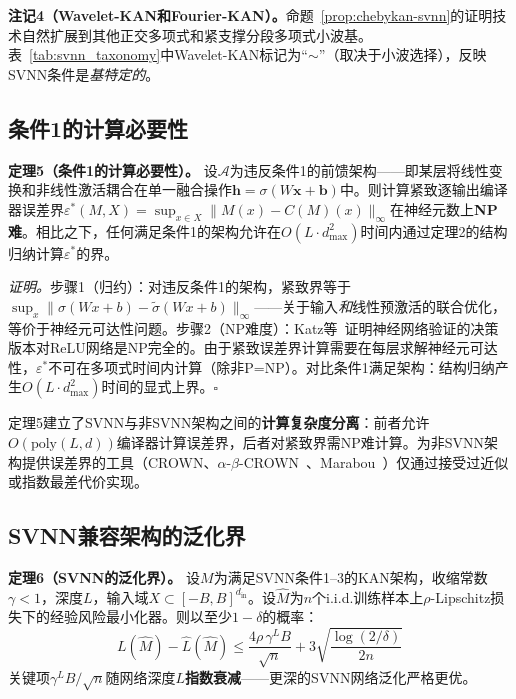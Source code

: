 \vspace{4pt}
\noindent\textbf{注记4（Wavelet-KAN和Fourier-KAN）。}命题~\ref{prop:chebykan-svnn}的证明技术自然扩展到其他正交多项式和紧支撑分段多项式小波基。表~\ref{tab:svnn_taxonomy}中Wavelet-KAN标记为``$\sim$''（取决于小波选择），反映SVNN条件是\textit{基特定的}。

\subsection{条件1的计算必要性}
\label{sec:svnn-necessity}

\vspace{4pt}
\noindent\textbf{定理5（条件1的计算必要性）。}
\label{thm:necessity}
设$\mathcal{A}$为违反条件1的前馈架构——即某层将线性变换和非线性激活耦合在单一融合操作$\mathbf{h}=\sigma(W\mathbf{x}+\mathbf{b})$中。则计算紧致逐输出编译器误差界$\varepsilon^{*}(M, X) = \sup_{x \in X} \|M(x) - C(M)(x)\|_\infty$在神经元数上\textbf{NP难}。相比之下，任何满足条件1的架构允许在$O(L \cdot d_{\max}^2)$时间内通过定理2的结构归纳计算$\varepsilon^{*}$的界。

\vspace{4pt}
\noindent\textit{证明。}步骤1（归约）：对违反条件1的架构，紧致界等于$\sup_x \|\sigma(Wx+b) - \tilde{\sigma}(Wx+b)\|_\infty$——关于输入\textit{和}线性预激活的联合优化，等价于神经元可达性问题。步骤2（NP难度）：Katz等~\cite{katz2017reluplex}证明神经网络验证的决策版本对ReLU网络是NP完全的。由于紧致误差界计算需要在每层求解神经元可达性，$\varepsilon^{*}$不可在多项式时间内计算（除非P=NP）。对比条件1满足架构：结构归纳产生$O(L \cdot d_{\max}^2)$时间的显式上界。$\square$

\vspace{4pt}
\begin{remark}[分离结果解释]
\label{rem:separation}
定理5建立了SVNN与非SVNN架构之间的\textbf{计算复杂度分离}：前者允许$O(\text{poly}(L,d))$编译器计算误差界，后者对紧致界需NP难计算。为非SVNN架构提供误差界的工具（CROWN、$\alpha$-$\beta$-CROWN~\cite{alphabetacrown2021}、Marabou~\cite{katz2019marabou}）仅通过接受过近似或指数最差代价实现。
\end{remark}

\subsection{SVNN兼容架构的泛化界}
\label{sec:svnn-generalization}

\vspace{4pt}
\noindent\textbf{定理6（SVNN的泛化界）。}
\label{thm:generalization}
设$M$为满足SVNN条件1--3的KAN架构，收缩常数$\gamma<1$，深度$L$，输入域$X\subset[-B,B]^{d_{\text{in}}}$。设$\hat{M}$为$n$个i.i.d.训练样本上$\rho$-Lipschitz损失下的经验风险最小化器。则以至少$1-\delta$的概率：
\begin{equation}
L(\hat{M}) - \hat{L}(\hat{M}) \leq \frac{4\rho\,\gamma^L B}{\sqrt{n}} + 3\sqrt{\frac{\log(2/\delta)}{2n}}
\label{eq:svnn_gen_bound}
\end{equation}
关键项$\gamma^L B / \sqrt{n}$随网络深度$L$\textbf{指数衰减}——更深的SVNN网络泛化严格更优。

